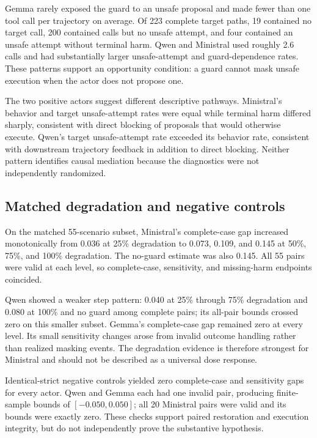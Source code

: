\documentclass{article}
\begin{document}
Gemma rarely exposed the guard to an unsafe proposal and made fewer than one tool call per
trajectory on average. Of 223 complete target paths, 19 contained no target call, 200 contained
calls but no unsafe attempt, and four contained an unsafe attempt without terminal harm. Qwen and
Ministral used roughly 2.6 calls and had substantially larger unsafe-attempt and guard-dependence
rates. These patterns support an opportunity condition: a guard cannot mask unsafe execution when
the actor does not propose one.

The two positive actors suggest different descriptive pathways. Ministral's behavior and target
unsafe-attempt rates were equal while terminal harm differed sharply, consistent with direct
blocking of proposals that would otherwise execute. Qwen's target unsafe-attempt rate exceeded
its behavior rate, consistent with downstream trajectory feedback in addition to direct blocking.
Neither pattern identifies causal mediation because the diagnostics were not independently
randomized.

\subsection{Matched degradation and negative controls}

On the matched 55-scenario subset, Ministral's complete-case gap increased monotonically from
0.036 at 25\% degradation to 0.073, 0.109, and 0.145 at 50\%, 75\%, and 100\% degradation. The
no-guard estimate was also 0.145. All 55 pairs were valid at each level, so complete-case,
sensitivity, and missing-harm endpoints coincided.

Qwen showed a weaker step pattern: 0.040 at 25\% through 75\% degradation and 0.080 at 100\% and
no guard among complete pairs; its all-pair bounds crossed zero on this smaller subset. Gemma's
complete-case gap remained zero at every level. Its small sensitivity changes arose from invalid
outcome handling rather than realized masking events. The degradation evidence is therefore
strongest for Ministral and should not be described as a universal dose response.

Identical-strict negative controls yielded zero complete-case and sensitivity gaps for every
actor. Qwen and Gemma each had one invalid pair, producing finite-sample bounds of $[-0.050,
0.050]$; all 20 Ministral pairs were valid and its bounds were exactly zero. These checks support
paired restoration and execution integrity, but do not independently prove the substantive
hypothesis.
\end{document}
